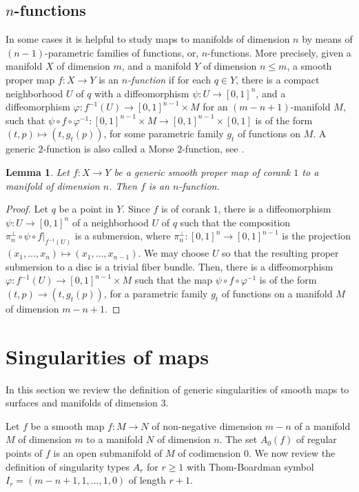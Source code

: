 \documentclass[12pt]{amsart}
\def\co{\colon}
\newtheorem{lemma}[theorem]{Lemma}
\theoremstyle{definition}
\begin{document}
\subsection{$n$-functions}

In some cases it is helpful to study maps to manifolds of dimension $n$ by means of $(n-1)$-parametric families of functions, or, $n$-functions.  More precisely, given a manifold $X$ of dimension $m$, and a manifold $Y$ of dimension $n\le m$, a smooth proper map $f\co X\to Y$ is an \emph{$n$-function} if for each $q\in Y$,  there is a compact neighborhood $U$ of $q$ with a diffeomorphism $\psi\co U\to [0,1]^n$,  and a diffeomorphism $\varphi\co f^{-1}(U)\to [0,1]^{n-1}\times M$ for an $(m-n+1)$-manifold $M$,  such that $\psi\circ f\circ \varphi^{-1}: [0,1]^{n-1}\times M\to [0,1]^{n-1}\times [0,1]$ is of the form $(t, p)\mapsto (t, g_t(p))$,  for some parametric family $g_t$ of functions on $M$.  A generic $2$-function is also called a Morse $2$-function, see \cite[Definition 2.7]{GK}.  

\begin{lemma}\label{l:8} Let $f\co X\to Y$ be a generic smooth proper map of corank $1$ to a manifold of dimension $n$. Then $f$ is an $n$-function. 
\end{lemma}
\begin{proof} Let $q$ be a point in $Y$. Since $f$ is of corank $1$, there is a diffeomorphism $\psi\co U\to [0,1]^n$ of a neighborhood $U$ of $q$ such that the composition $\pi^\perp_n\circ \psi \circ f|_{f^{-1}(U)}$ is a submersion, where $\pi^\perp_n\co [0,1]^n\to [0,1]^{n-1}$ is the projection $(x_1,..., x_n)\mapsto (x_1,..., x_{n-1})$. We may choose $U$ so that the resulting proper submersion to a disc is a trivial fiber bundle. Then,  there is a diffeomorphism $\varphi\co f^{-1}(U)\to [0,1]^{n-1}\times M$ such that the map $\psi\circ f\circ \varphi^{-1}$ is of the form $(t, p)\to (t, g_t(p))$, for a parametric family $g_t$ of functions on a manifold $M$ of dimension ${m-n+1}$. 
\end{proof}

 
\section{Singularities of maps}\label{s:3}
 In this section we review the definition of generic singularities of smooth maps to surfaces and manifolds of dimension $3$.

 Let $f$ be a smooth map $f\co M\to N$ of non-negative dimension $m-n$ of a manifold $M$ of dimension $m$ to a manifold $N$ of dimension $n$. 
The set $A_0(f)$ of regular points of $f$ is an open submanifold of $M$ of codimension $0$. We now review the definition of singularity types $A_r$ for $r\ge 1$ with Thom-Boardman symbol $I_r=(m-n+1, 1, ..., 1, 0)$ of length $r+1$. 
\end{document}
